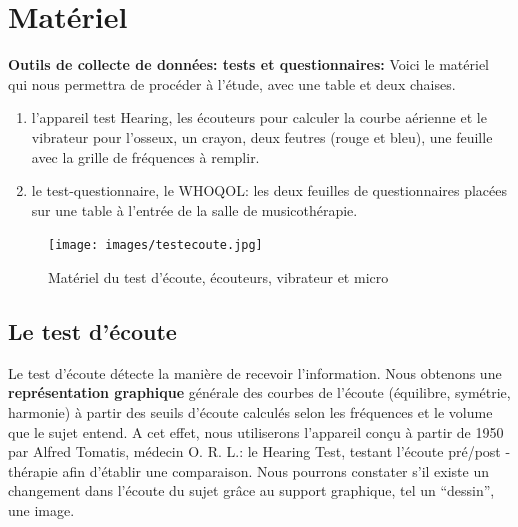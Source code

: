 \section{Matériel}
\textbf{Outils de collecte de données: tests et questionnaires: }
Voici le matériel qui nous permettra de procéder à l'étude, avec une table et deux chaises.
\begin{enumerate}
	\item l'appareil
	test Hearing, les écouteurs pour calculer la courbe  aérienne et le vibrateur pour l'osseux, un crayon, 
	deux
	feutres (rouge et bleu), une feuille avec la grille de fréquences à
	remplir.

	\item le test-questionnaire, le WHOQOL: 
les deux feuilles de questionnaires placées sur une table à l'entrée de la salle de musicothérapie.
\end{enumerate}
\begin{figure}
	\centering
	\texttt{[image: images/testecoute.jpg]}
	\caption[Appareil test écoute]{Matériel du test d'écoute, écouteurs, vibrateur et micro}
	
	\label{appareiltestecoute}
\end{figure}

\subsection *{Le test d'écoute}
Le test d'écoute détecte la manière de recevoir
l'information.
Nous obtenons une
\textbf{représentation graphique} générale des courbes de l'écoute
(équilibre, symétrie, harmonie) à partir des seuils d'écoute
calculés selon les fréquences et le volume que le sujet entend.
A cet effet, nous utiliserons l'appareil conçu à partir de 1950 par Alfred Tomatis, médecin
O. R. L.: le Hearing Test, testant
l'écoute pré/post - thérapie
afin d'établir une comparaison.
Nous pourrons constater
s'il existe un changement dans l'écoute du sujet grâce au support graphique, tel un ``dessin'',
une image. %

